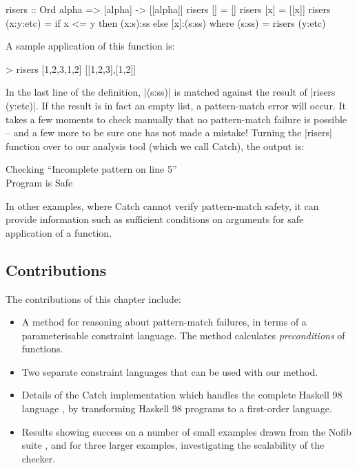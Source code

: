 \begin{example}
\label{exC:risers}
\begin{code}
risers :: Ord alpha => [alpha] -> [[alpha]]
risers [] = []
risers [x] = [[x]]
risers (x:y:etc) = if x <= y then (x:s):ss else [x]:(s:ss)
    where (s:ss) = risers (y:etc)
\end{code}

\noindent A sample application of this function is:

\ignore\begin{code}
> risers [1,2,3,1,2]
[[1,2,3],[1,2]]
\end{code}

\noindent In the last line of the definition, |(s:ss)| is matched against the result of |risers (y:etc)|. If the result is in fact an empty list, a pattern-match error will occur. It takes a few moments to check manually that no pattern-match failure is possible -- and a few more to be sure one has not made a mistake! Turning the |risers| function over to our analysis tool (which we call Catch), the output is:

\begin{console}
Checking ``Incomplete pattern on line 5'' \\
Program is Safe
\end{console}
\end{example}

In other examples, where Catch cannot verify pattern-match safety, it can provide information such as sufficient conditions on arguments for safe application of a function.

\subsection{Contributions}

The contributions of this chapter include:

\begin{itemize}
\item A method for reasoning about pattern-match failures, in terms of a parameterisable constraint language. The method calculates \textit{preconditions} of functions.
\item Two separate constraint languages that can be used with our method.
\item Details of the Catch implementation which handles the complete Haskell 98 language \cite{haskell}, by transforming Haskell 98 programs to a first-order language.
\item Results showing success on a number of small examples drawn from the Nofib suite \cite{nofib}, and for three larger examples, investigating the scalability of the checker.
\end{itemize}


